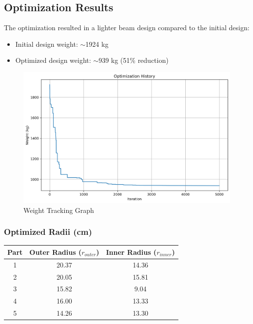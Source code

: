 \subsection{Optimization Results}
The optimization resulted in a lighter beam design compared to the initial design:

\begin{itemize}
    \item Initial design weight: $\sim$1924 kg
    \item Optimized design weight: $\sim$939 kg (51\% reduction)
\end{itemize}

\begin{figure}[H]
    \centering
    \includegraphics[width=1\textwidth]{weeks_new/imgs/optimization_history.png}
    \caption{Weight Tracking Graph}
    \label{fig:optimization_history}
\end{figure}

\subsubsection{Optimized Radii (cm)}
\begin{center}
\begin{tabular}{|c|c|c|}
\hline
Part & Outer Radius ($r_{outer}$) & Inner Radius ($r_{inner}$) \\
\hline
1 & 20.37 & 14.36 \\
2 & 20.05 & 15.81 \\
3 & 15.82 & 9.04 \\
4 & 16.00 & 13.33 \\
5 & 14.26 & 13.30 \\
\hline
\end{tabular}
\end{center}

